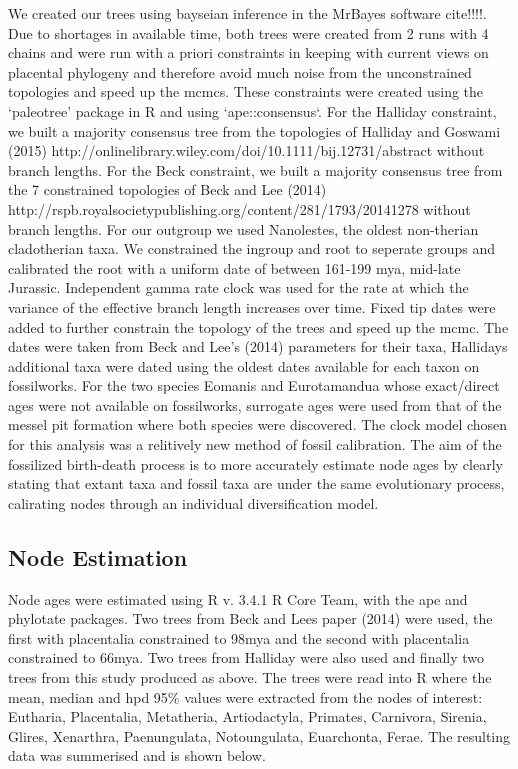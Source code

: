 \documentclass[11pt,letterpaper]{article}
\begin{document}
We created our trees using bayseian inference in the MrBayes software cite!!!!. Due to shortages in available time, both trees were created from 2 runs with 4 chains and were run with a priori constraints in keeping with current views on placental phylogeny and therefore avoid much noise from the unconstrained topologies and speed up the mcmcs. These constraints were created using the `paleotree' package in R and using `ape::consensus`. For the Halliday constraint, we built a majority consensus tree from the topologies of Halliday and Goswami (2015) http://onlinelibrary.wiley.com/doi/10.1111/bij.12731/abstract without branch lengths. For the Beck constraint, we built a majority consensus tree from the 7 constrained topologies of Beck and Lee (2014) http://rspb.royalsocietypublishing.org/content/281/1793/20141278 without branch lengths. For our outgroup we used Nanolestes, the oldest non-therian cladotherian taxa. We constrained the ingroup and root to seperate groups and calibrated the root with a uniform date of between 161-199 mya, mid-late Jurassic. Independent gamma rate clock was used for the rate at which the variance of the effective branch length increases over time. Fixed tip dates were added to further constrain the topology of the trees and speed up the mcmc. The dates were taken from Beck and Lee's (2014) parameters for their taxa, Hallidays additional taxa were dated using the oldest dates available for each taxon on fossilworks. For the two species Eomanis and Eurotamandua whose exact/direct ages were not available on fossilworks, surrogate ages were used from that of the messel pit formation where both species were discovered. The clock model chosen for this analysis was a relitively new method of fossil calibration. The aim of the fossilized birth-death process is to more accurately estimate node ages by clearly stating that extant taxa and fossil taxa are under the same evolutionary process, calirating nodes through an individual diversification model.

\newpage

\subsection{Node Estimation}

Node ages were estimated using R v. 3.4.1 R Core Team, with the ape and phylotate packages. Two trees from Beck and Lees paper (2014) were used, the first with placentalia constrained to 98mya and the second with placentalia constrained to 66mya. Two trees from Halliday were also used and finally two trees from this study produced as above. The trees were read into R where the mean, median and hpd 95\% values were extracted from the nodes of interest: Eutharia, Placentalia, Metatheria, Artiodactyla, Primates, Carnivora, Sirenia, Glires, Xenarthra, Paenungulata, Notoungulata, Euarchonta, Ferae. The resulting data was summerised and is shown below. 
\end{document}
